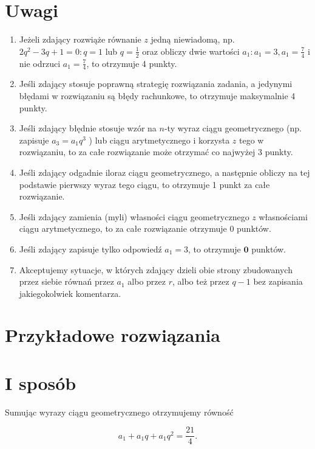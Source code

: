 \documentclass[10pt]{article}
\begin{document}
\section*{Uwagi}
\begin{enumerate}
  \item Jeżeli zdający rozwiąże równanie $z$ jedną niewiadomą, np. $2 q^{2}-3 q+1=0: q=1$ lub $q=\frac{1}{2}$ oraz obliczy dwie wartości $a_{1}: a_{1}=3, a_{1}=\frac{7}{4}$ i nie odrzuci $a_{1}=\frac{7}{4}$, to otrzymuje 4 punkty.
  \item Jeśli zdający stosuje poprawną strategię rozwiązania zadania, a jedynymi błędami w rozwiązaniu są błędy rachunkowe, to otrzymuje maksymalnie 4 punkty.
  \item Jeśli zdający błędnie stosuje wzór na $n$-ty wyraz ciągu geometrycznego (np. zapisuje $a_{3}=a_{1} q^{3}$ ) lub ciągu arytmetycznego i korzysta $z$ tego w rozwiązaniu, to za całe rozwiązanie może otrzymać co najwyżej 3 punkty.
  \item Jeśli zdający odgadnie iloraz ciągu geometrycznego, a następnie obliczy na tej podstawie pierwszy wyraz tego ciągu, to otrzymuje 1 punkt za całe rozwiązanie.
  \item Jeśli zdający zamienia (myli) własności ciągu geometrycznego $z$ własnościami ciągu arytmetycznego, to za całe rozwiązanie otrzymuje 0 punktów.
  \item Jeśli zdający zapisuje tylko odpowiedź $a_{1}=3$, to otrzymuje $\mathbf{0}$ punktów.
  \item Akceptujemy sytuacje, w których zdający dzieli obie strony zbudowanych przez siebie równań przez $a_{1}$ albo przez $r$, albo też przez $q-1$ bez zapisania jakiegokolwiek komentarza.
\end{enumerate}

\section*{Przykładowe rozwiązania}
\section*{I sposób}
Sumując wyrazy ciągu geometrycznego otrzymujemy równość


\begin{equation*}
a_{1}+a_{1} q+a_{1} q^{2}=\frac{21}{4} . \tag{1}
\end{equation*}
\end{document}
